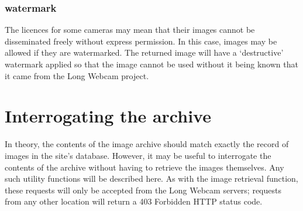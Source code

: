 \documentclass[11pt]{article}
\begin{document}
\subsubsection{watermark}
The licences for some cameras may mean that their images cannot be disseminated freely without express permission. In this case, images may be allowed if they are watermarked. The returned image will have a `destructive' watermark applied so that the image cannot be used without it being known that it came from the Long Webcam project.

\section{Interrogating the archive}
In theory, the contents of the image archive should match exactly the record of images in the site's database. However, it may be useful to interrogate the contents of the archive without having to retrieve the images themselves. Any such utility functions will be described here. As with the image retrieval function, these requests will only be accepted from the Long Webcam servers; requests from any other location will return a 403 Forbidden HTTP status code.
\end{document}
